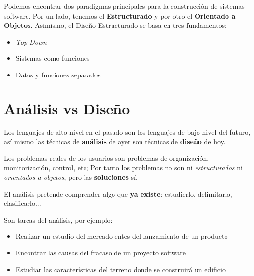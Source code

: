


Podemos encontrar dos paradigmas principales para la construcción de sistemas
software. Por un lado, tenemos el \textbf{Estructurado} y por otro el
\textbf{Orientado a Objetos}. Asimismo, el Diseño Estructurado se basa en tres
fundamentos:

\begin{itemize}[noitemsep]
\item \emph{Top-Down}
\item Sistemas como funciones
\item Datos y funciones separados
\end{itemize}


\section{Análisis vs Diseño}

Los lenguajes de alto nivel en el pasado son los lenguajes de bajo nivel del futuro, así mismo las técnicas de \textbf{análisis} de ayer son técnicas de \textbf{diseño} de hoy.

Los problemas reales de los usuarios son problemas de organización, monitorización, control, etc; Por tanto los problemas no son ni \textit{estructurados} ni \textit{orientados a objetos}, pero las \textbf{soluciones} sí.

El análisis pretende comprender algo que \textbf{ya existe}: estudierlo, delimitarlo, clasificarlo...

Son tareas del análisis, por ejemplo:

\begin{itemize}[noitemsep]
\item Realizar un estudio del mercado entes del lanzamiento de un producto
\item Encontrar las causas del fracaso de un proyecto software
\item Estudiar las características del terreno donde se construirá un edificio
\end{itemize}

